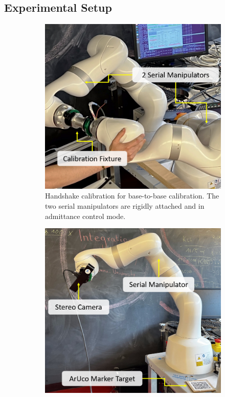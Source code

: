 \subsection{Experimental Setup}
\label{c1:sec:experimental_setup}
\begin{figure}
     \centering
     \begin{subfigure}[b]{0.3\textwidth}
         \centering
         \includegraphics[width=\textwidth]{fig/handshake.png}
         \caption{Handshake calibration for base-to-base calibration. The two serial manipulators are rigidly attached and in admittance control mode.}
         \label{c1:fig:handshake}
     \end{subfigure}
     \hfill
     \begin{subfigure}[b]{0.3\textwidth}
         \centering
         \includegraphics[width=\textwidth]{fig/eye_in_hand.png}

\end{subfigure}
\end{figure}
